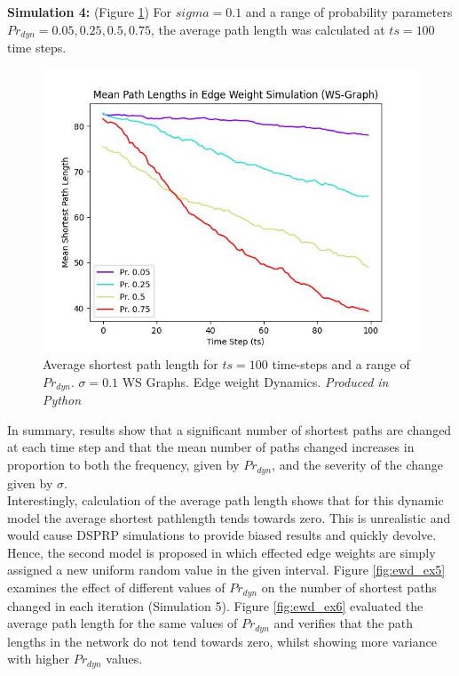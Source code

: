 \documentclass[
	a4paper, %
	10pt, %
	unnumberedsections, %
	twoside, %
]{LTJournalArticle}
\begin{document}
\textbf{Simulation 4:} (Figure \ref{fig:ewd_ex4}) For \(sigma = 0.1\) and a range of probability parameters \(Pr_{dyn} = 0.05, 0.25, 0.5, 0.75\), the average path length was calculated at \(ts = 100\) time steps. \\

\begin{figure}[H]
	\includegraphics[width=\linewidth]{Figures/ewd/ew1_length_prob.jpg}
	\caption{Average shortest path length for \(ts = 100\) time-steps and a range of \(Pr_{dyn}\). \(\sigma = 0.1\) WS Graphs. Edge weight Dynamics. \emph{Produced in Python}}
	\label{fig:ewd_ex4}
\end{figure}

In summary, results show that a significant number of shortest paths are changed at each time step and that the mean number of paths changed increases in proportion to both the frequency, given by \(Pr_{dyn}\), and the severity of the change given by \(\sigma\). \\

Interestingly, calculation of the average path length shows that for this dynamic model the average shortest pathlength tends towards zero. This is unrealistic and would cause DSPRP simulations to provide biased results and quickly devolve. \\

Hence, the second model is proposed in which effected edge weights are simply assigned a new uniform random value in the given interval. Figure \ref{fig:ewd_ex5} examines the effect of different values of \(Pr_{dyn}\) on the number of shortest paths changed in each iteration (Simulation 5). Figure \ref{fig:ewd_ex6} evaluated the average path length for the same values of \(Pr_{dyn}\) and verifies that the path lengths in the network do not tend towards zero, whilst showing more variance with higher \(Pr_{dyn}\) values. \\
\end{document}
